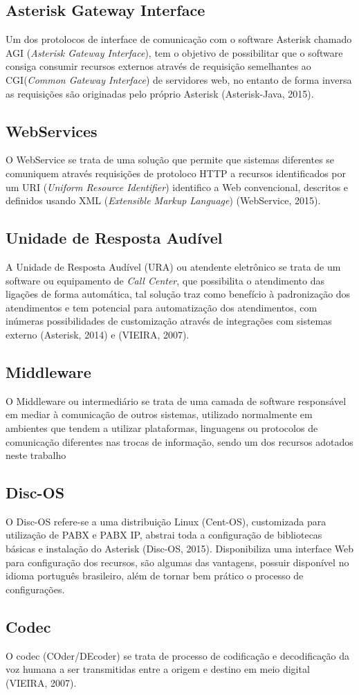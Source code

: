 \subsection{Asterisk Gateway Interface}
Um dos protolocos de interface de comunicação  com o software Asterisk chamado AGI (\textit{Asterisk Gateway Interface}), tem o objetivo de possibilitar que o software consiga consumir recursos externos através de requisição semelhantes ao CGI(\textit{Common Gateway Interface}) de servidores web, no entanto de forma inversa as requisições são originadas pelo próprio Asterisk (Asterisk-Java, 2015).

\subsection{WebServices}
O WebService se trata de uma solução que permite que sistemas diferentes se comuniquem através requisições de protoloco HTTP a recursos identificados por um URI (\textit{Uniform Resource Identifier}) identifico a Web convencional, descritos e definidos usando XML (\textit{Extensible Markup Language}) (WebService, 2015).

\subsection{Unidade de Resposta Audível}
A Unidade de Resposta Audível (URA) ou atendente eletrônico se trata de um software ou equipamento de \textit{Call Center}, que possibilita o atendimento das ligações de forma automática, tal solução traz como benefício à padronização dos atendimentos e tem potencial para automatização dos atendimentos, com inúmeras possibilidades de customização através de integrações com sistemas externo (Asterisk, 2014) e (VIEIRA, 2007).

\subsection{Middleware}
O Middleware ou intermediário se trata de uma camada de software responsável em mediar à comunicação de outros sistemas, utilizado normalmente em ambientes que tendem a utilizar plataformas, linguagens ou protocolos de comunicação diferentes nas trocas de informação, sendo um dos recursos adotados neste trabalho \cite{ALMEIDA}

\subsection{Disc-OS}
O Disc-OS refere-se a uma distribuição Linux (Cent-OS), customizada para utilização de PABX e PABX IP, abstrai toda a configuração de bibliotecas básicas e instalação do Asterisk (Disc-OS, 2015). Disponibiliza uma interface Web para configuração dos recursos, são algumas das vantagens, possuir disponível no idioma português brasileiro, além de tornar bem prático o processo de configurações.

\subsection{Codec}
O codec (COder/DEcoder) se trata de processo de codificação e decodificação da voz humana a ser transmitidas entre a origem e destino em meio digital (VIEIRA, 2007).